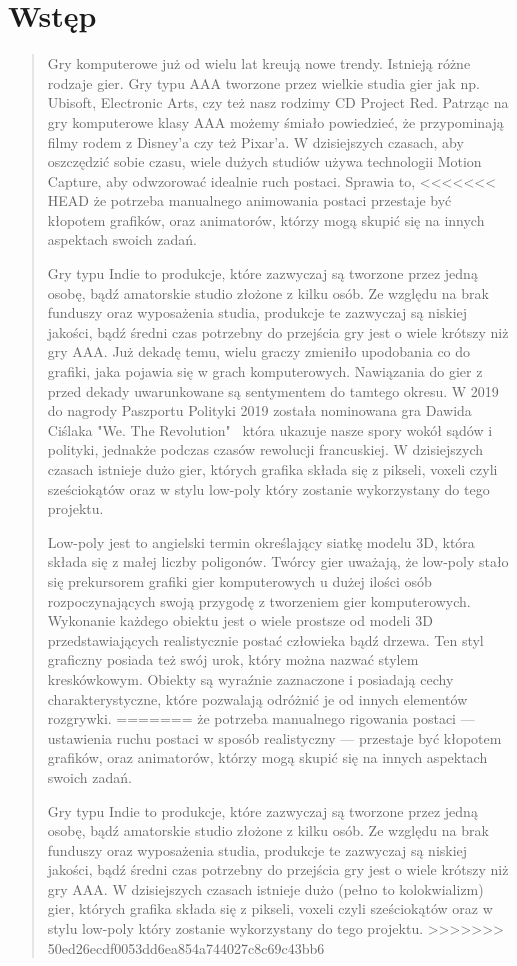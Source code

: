 \chapter*{Wstęp}
\begin{quotation}
\indent Gry komputerowe już od wielu lat kreują nowe trendy. Istnieją różne rodzaje gier.
Gry typu AAA tworzone przez wielkie studia gier jak np. Ubisoft, Electronic Arts, czy też nasz rodzimy CD Project Red. 
Patrząc na gry komputerowe klasy AAA możemy śmiało powiedzieć, że przypominają filmy rodem z Disney'a czy też Pixar'a. 
W dzisiejszych czasach, aby oszczędzić sobie czasu, wiele dużych studiów używa technologii Motion Capture, aby odwzorować idealnie ruch postaci. Sprawia to,
<<<<<<< HEAD
że potrzeba manualnego animowania postaci przestaje być kłopotem grafików, oraz animatorów, którzy mogą skupić się na innych aspektach swoich zadań.

\indent Gry typu Indie to produkcje, które zazwyczaj są tworzone przez jedną osobę, bądź amatorskie studio złożone z kilku osób. Ze względu na brak funduszy oraz wyposażenia studia, produkcje te zazwyczaj są niskiej jakości, bądź średni czas potrzebny do przejścia gry jest o wiele krótszy niż gry AAA. Już dekadę temu, wielu graczy zmieniło upodobania co do grafiki, jaka pojawia się w grach komputerowych. Nawiązania do gier z przed dekady uwarunkowane są sentymentem do tamtego okresu. W 2019 do nagrody Paszportu Polityki 2019 została nominowana gra Dawida Ciślaka "We. The Revolution" ~która ukazuje nasze spory wokół sądów i polityki, jednakże podczas czasów rewolucji francuskiej. W dzisiejszych czasach istnieje dużo gier, których grafika składa się z pikseli, voxeli czyli sześciokątów oraz w stylu low-poly który zostanie wykorzystany do tego projektu.

\indent Low-poly jest to angielski termin określający siatkę modelu 3D, która składa się z małej liczby poligonów. Twórcy gier uważają, że low-poly stało się prekursorem grafiki gier komputerowych u dużej ilości osób rozpoczynających swoją przygodę z tworzeniem gier komputerowych. Wykonanie każdego obiektu jest o wiele prostsze od modeli 3D przedstawiających realistycznie postać człowieka bądź drzewa. Ten styl graficzny posiada też swój urok, który można nazwać stylem kreskówkowym. Obiekty są wyraźnie zaznaczone i posiadają cechy charakterystyczne, które pozwalają odróżnić je od innych elementów rozgrywki.
=======
że potrzeba manualnego rigowania postaci --- ustawienia ruchu postaci w sposób realistyczny --- przestaje być kłopotem grafików, oraz animatorów, którzy mogą skupić się na innych aspektach swoich zadań.

\indent Gry typu Indie to produkcje, które zazwyczaj są tworzone przez jedną osobę, bądź amatorskie studio złożone z kilku osób. Ze względu na brak funduszy oraz wyposażenia studia, produkcje te zazwyczaj są niskiej jakości, bądź średni czas potrzebny do przejścia gry jest o wiele krótszy niż gry AAA.
W dzisiejszych czasach istnieje dużo (pełno to kolokwializm) gier, których grafika składa się z pikseli, voxeli czyli sześciokątów oraz w stylu low-poly który zostanie wykorzystany do tego projektu.
>>>>>>> 50ed26ecdf0053dd6ea854a744027c8c69c43bb6

\newpage 
\end{quotation}

